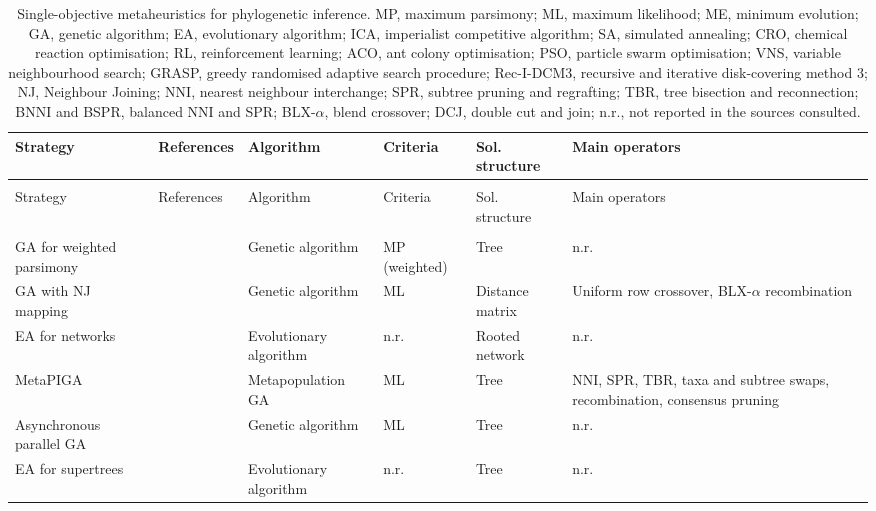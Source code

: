 \begin{landscape}
{\scriptsize
\setlength{\tabcolsep}{4pt}
\setlength{\LTcapwidth}{\linewidth}
\begin{longtable}{>{\raggedright\arraybackslash}p{2.7cm}>{\raggedright\arraybackslash}p{2.1cm}>{\raggedright\arraybackslash}p{2.8cm}>{\raggedright\arraybackslash}p{2.7cm}>{\raggedright\arraybackslash}p{2.3cm}>{\raggedright\arraybackslash}p{4.0cm}}
\caption{Single-objective metaheuristics for phylogenetic inference. MP, maximum parsimony; ML, maximum likelihood; ME, minimum evolution; GA, genetic algorithm; EA, evolutionary algorithm; ICA, imperialist competitive algorithm; SA, simulated annealing; CRO, chemical reaction optimisation; RL, reinforcement learning; ACO, ant colony optimisation; PSO, particle swarm optimisation; VNS, variable neighbourhood search; GRASP, greedy randomised adaptive search procedure; Rec-I-DCM3, recursive and iterative disk-covering method 3; NJ, Neighbour Joining; NNI, nearest neighbour interchange; SPR, subtree pruning and regrafting; TBR, tree bisection and reconnection; BNNI and BSPR, balanced NNI and SPR; BLX-$\alpha$, blend crossover; DCJ, double cut and join; n.r., not reported in the sources consulted.}\label{tab:so}\\
\toprule
Strategy & References & Algorithm & Criteria & Sol. structure & Main operators
\\
\midrule
\endfirsthead
\multicolumn{6}{l}{\emph{Table \ref{tab:so} (continued)}}\\
\toprule
Strategy & References & Algorithm & Criteria & Sol. structure & Main operators
\\
\midrule
\endhead
\bottomrule
\endfoot
\multicolumn{6}{l}{\textit{Evolutionary algorithms}}\\
GA for weighted parsimony & \cite{R01166} & Genetic algorithm & MP (weighted) & Tree & n.r.\\
GA with NJ mapping & \cite{R05258} & Genetic algorithm & ML & Distance matrix & Uniform row crossover, BLX-$\alpha$ recombination\\
EA for networks & \cite{R00270} & Evolutionary algorithm & n.r. & Rooted network & n.r.\\
MetaPIGA & \cite{R05462} & Metapopulation GA & ML & Tree & NNI, SPR, TBR, taxa and subtree swaps, recombination, consensus pruning\\
Asynchronous parallel GA & \cite{R04035} & Genetic algorithm & ML & Tree & n.r.\\
EA for supertrees & \cite{R04034} & Evolutionary algorithm & n.r. & Tree & n.r.\\

\end{longtable}}
\end{landscape}
